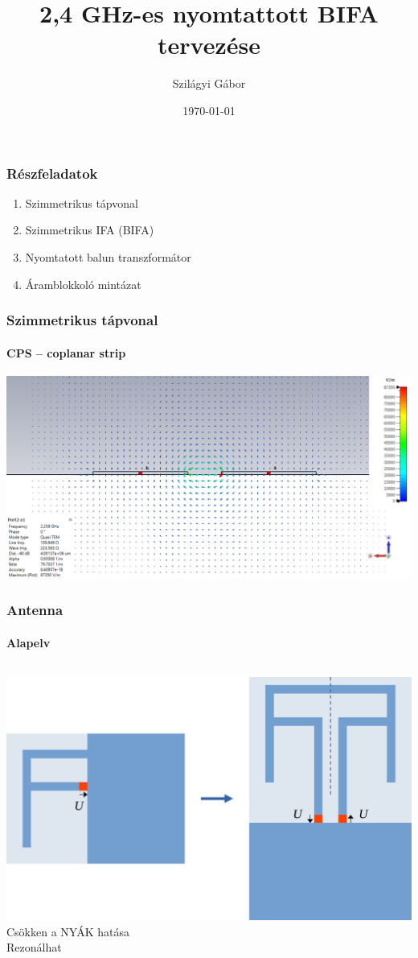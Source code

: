 \documentclass[aspectratio=43]{beamer}
\title{2,4 GHz-es nyomtattott BIFA tervezése}			%
\subtitle{} 	%
\date{\today}
\author{Szilágyi Gábor}	%
\institute{Silicon Laboratories} %
\begin{document}
\maketitle	%
\begin{frame}
	\frametitle{Részfeladatok}
			\begin{enumerate}
				\item<0-3> Szimmetrikus tápvonal \\[1.5ex]
				\item<0-3> Szimmetrikus IFA (BIFA) \\[1.5ex]
				\item<0-2> Nyomtatott balun transzformátor \\[1.5ex]
				\item<0-1> Áramblokkoló mintázat
			\end{enumerate}
\end{frame}
\begin{frame}
	\frametitle{Szimmetrikus tápvonal}
	\framesubtitle{CPS -- coplanar strip}
	\centering
	\includegraphics[width=\textwidth]{e1_2.png}
\end{frame}
\begin{frame}
	\frametitle{Antenna}
	\framesubtitle{Alapelv}
	\begin{columns}	
			\includegraphics[width=\textwidth]{ifa-bifa.pdf}
			Csökken a NYÁK hatása\\[2ex]
			Rezonálhat
	\end{columns}
\end{frame}
\end{document}
